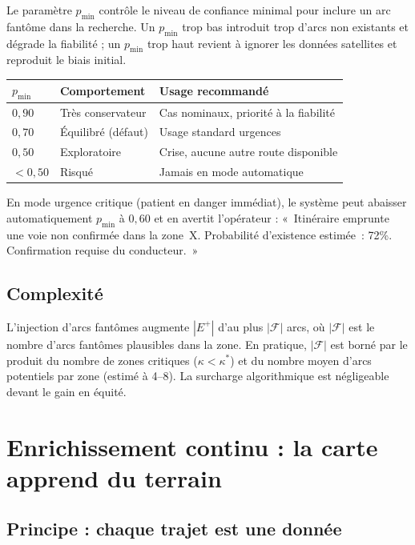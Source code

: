 \documentclass[12pt,a4paper]{article}
\theoremstyle{definition}
\theoremstyle{remark}
\begin{document}
Le paramètre $p_{\min}$ contrôle le niveau de confiance minimal
pour inclure un arc fantôme dans la recherche. Un $p_{\min}$ trop
bas introduit trop d'arcs non existants et dégrade la fiabilité ;
un $p_{\min}$ trop haut revient à ignorer les données satellites
et reproduit le biais initial.

\begin{center}
\begin{tabular}{llp{7cm}}
  \toprule
  $p_{\min}$ & \textbf{Comportement} & \textbf{Usage recommandé} \\
  \midrule
  $0{,}90$ & Très conservateur & Cas nominaux, priorité à la fiabilité \\
  $0{,}70$ & Équilibré (défaut) & Usage standard urgences \\
  $0{,}50$ & Exploratoire & Crise, aucune autre route disponible \\
  $< 0{,}50$ & Risqué & Jamais en mode automatique \\
  \bottomrule
\end{tabular}
\end{center}

En mode urgence critique (patient en danger immédiat), le système
peut abaisser automatiquement $p_{\min}$ à $0{,}60$ et en avertit
l'opérateur : «~Itinéraire emprunte une voie non confirmée dans
la zone~X. Probabilité d'existence estimée~: 72\%. Confirmation
requise du conducteur.~»

\subsection{Complexité}

L'injection d'arcs fantômes augmente $|E^+|$ d'au plus
$|\mathcal{F}|$ arcs, où $|\mathcal{F}|$ est le nombre d'arcs
fantômes plausibles dans la zone. En pratique, $|\mathcal{F}|$
est borné par le produit du nombre de zones critiques
($\kappa < \kappa^*$) et du nombre moyen d'arcs potentiels
par zone (estimé à 4--8). La surcharge algorithmique est
négligeable devant le gain en équité.

\newpage

\section{Enrichissement continu : la carte apprend du terrain}

\subsection{Principe : chaque trajet est une donnée}
\end{document}

